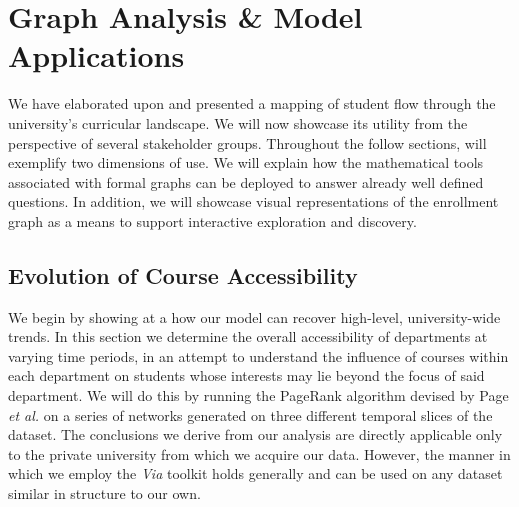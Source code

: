 \documentclass{sigchi}
\begin{document}
\section{Graph Analysis \& Model Applications}
\label{sec:analysis}
We have elaborated upon and presented a mapping of student flow through the
university's curricular landscape. We will now showcase its utility from the perspective of several stakeholder groups. Throughout the follow sections, will exemplify two dimensions of use. We will explain how the mathematical tools associated with formal graphs can be deployed to answer already well defined questions. In addition, we will showcase visual representations of the enrollment graph as a means to support interactive exploration and discovery. 

\subsection{Evolution of Course Accessibility}
\label{sec:course_pref_evolution}

We begin by showing at a how our model can recover high-level, university-wide trends. In this section we determine the overall accessibility of departments at varying time periods, in an attempt to understand the influence of courses within each department on students whose interests may lie beyond the focus of said department. We will do this by running the PageRank algorithm devised by Page \textit{et al.}  \cite{Page1999}  on a series of networks generated on three different temporal slices of the dataset. The conclusions we derive from our analysis are directly applicable only to the private university from which we acquire our data. However, the manner in which we employ the \textit{Via} toolkit holds generally and can be used on any dataset similar in structure to our own.
\end{document}

